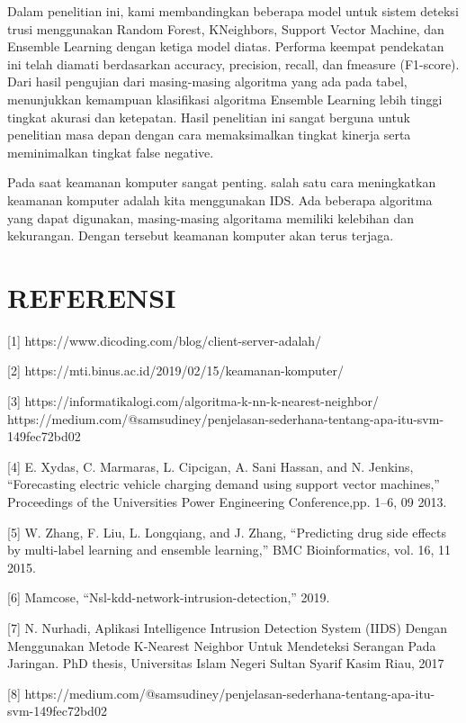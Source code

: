 \documentclass[conference]{IEEEtran}
\begin{document}
Dalam penelitian ini, kami membandingkan beberapa model
untuk sistem deteksi trusi menggunakan Random Forest, KNeighbors, Support Vector Machine, dan Ensemble Learning
dengan ketiga model diatas. Performa keempat pendekatan ini
telah diamati berdasarkan accuracy, precision, recall, dan fmeasure (F1-score).
Dari hasil pengujian dari masing-masing algoritma yang
ada pada tabel, menunjukkan kemampuan klasifikasi algoritma
Ensemble Learning lebih tinggi tingkat akurasi dan ketepatan.
Hasil penelitian ini sangat berguna untuk penelitian masa
depan dengan cara memaksimalkan tingkat kinerja serta meminimalkan tingkat false negative.

Pada saat keamanan komputer sangat penting. salah satu
cara meningkatkan keamanan komputer adalah kita menggunakan IDS. Ada beberapa algoritma yang dapat digunakan,
masing-masing algoritama memiliki kelebihan dan kekurangan. Dengan tersebut keamanan komputer akan terus terjaga.


\section{REFERENSI}

[1] https://www.dicoding.com/blog/client-server-adalah/

[2] https://mti.binus.ac.id/2019/02/15/keamanan-komputer/

[3] https://informatikalogi.com/algoritma-k-nn-k-nearest-neighbor/
https://medium.com/@samsudiney/penjelasan-sederhana-tentang-apa-itu-svm-149fec72bd02

[4] E. Xydas, C. Marmaras, L. Cipcigan, A. Sani Hassan, and N. Jenkins,
“Forecasting electric vehicle charging demand using support vector machines,” Proceedings of the Universities Power Engineering Conference,pp. 1–6, 09 2013.

[5] W. Zhang, F. Liu, L. Longqiang, and J. Zhang, “Predicting drug side
effects by multi-label learning and ensemble learning,” BMC Bioinformatics, vol. 16, 11 2015.

[6] Mamcose, “Nsl-kdd-network-intrusion-detection,” 2019.

[7] N. Nurhadi, Aplikasi Intelligence Intrusion Detection System (IIDS)
Dengan Menggunakan Metode K-Nearest Neighbor Untuk Mendeteksi
Serangan Pada Jaringan. PhD thesis, Universitas Islam Negeri Sultan
Syarif Kasim Riau, 2017

[8] https://medium.com/@samsudiney/penjelasan-sederhana-tentang-apa-itu-svm-149fec72bd02
\end{document}
